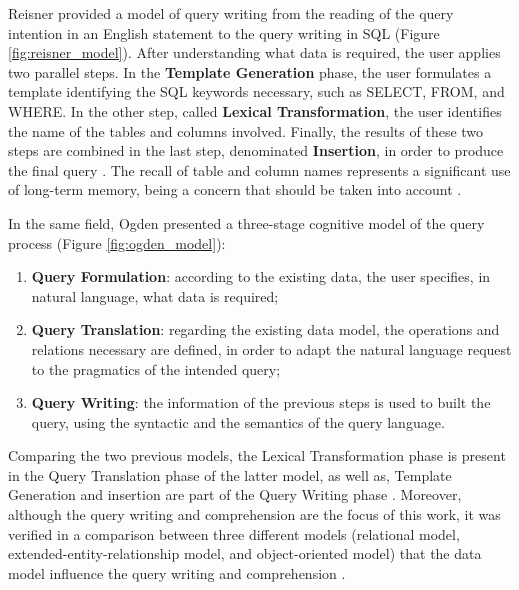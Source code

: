 Reisner \cite{humanFactorStudiesOfDatabaseQueryLanguages} provided a model of query writing from the reading of the query intention in an English statement to the query writing in \gls{SQL} (Figure \ref{fig:reisner_model}). After understanding what data is required, the user applies two parallel steps. In the \textbf{Template Generation} phase, the user formulates a template identifying the \gls{SQL} keywords necessary, such as SELECT, FROM, and WHERE. In the other step, called \textbf{Lexical Transformation}, the user identifies the name of the tables and columns involved. Finally, the results of these two steps are combined in the last step, denominated \textbf{Insertion}, in order to produce the final query \cite{humanFactorStudiesOfDatabaseQueryLanguages}. The recall of table and column names represents a significant use of long-term memory, being a concern that should be taken into account \cite{userErrorsInDatabaseQueryComposition}.

In the same field, Ogden \cite{implicationsOfACognitiveModelOfDatabaseQuery} presented a three-stage cognitive model of the query process (Figure \ref{fig:ogden_model}):

\begin{enumerate}
  \item \textbf{Query Formulation}: according to the existing data, the user specifies, in natural language, what data is required;
  \item \textbf{Query Translation}: regarding the existing data model, the operations and relations necessary are defined, in order to adapt the natural language request to the pragmatics of the intended query;
  \item \textbf{Query Writing}: the information of the previous steps is used to built the query, using the syntactic and the semantics of the query language.
\end{enumerate}

Comparing the two previous models, the Lexical Transformation phase is present in the Query Translation phase of the latter model, as well as, Template Generation and insertion are part of the Query Writing phase \cite{anEvaluationOfNoviceEndUserComputingPerformance}. Moreover, although the query writing and comprehension are the focus of this work, it was verified in a comparison between three different models (relational model, extended-entity-relationship model, and object-oriented model) that the data model influence the query writing and comprehension \cite{anEvaluationOfNoviceEndUserComputingPerformance}.

